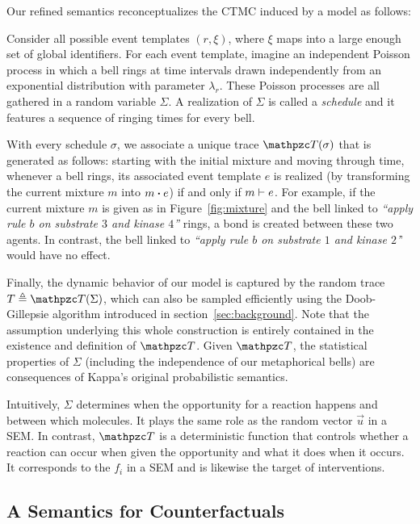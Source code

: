 Our refined semantics reconceptualizes the CTMC induced by a model as
follows:
\begin{inparaenum}[(i)]
\item Consider all possible event templates $(r, \xi)$, where $\xi$
  maps into a large enough set of global identifiers. For each event
  template, imagine an independent Poisson process in which a bell
  rings at time intervals drawn independently from an exponential
  distribution with parameter $\lambda_r$. These Poisson processes are
  all gathered in a random variable $\Sigma$. A realization of
  $\Sigma$ is called a \emph{schedule} and it features a sequence of
  ringing times for every bell.
\item With every schedule $\sigma$, we associate a unique trace
  $\DetTrace(\sigma)$ that is generated as follows: starting with the
  initial mixture and moving through time, whenever a bell rings, its
  associated event template $e$ is realized (by transforming the
  current mixture $m$ into $\UPDATE{m}{e}$) if and only if
  $m \vdash e$. For example, if the current mixture $m$ is
  given as in Figure~\ref{fig:mixture} and the bell linked to
  \textit{``apply rule $b$ on substrate $3$ and kinase $4$''} rings, a
  bond is created between these two agents. In contrast, the bell
  linked to \textit{``apply rule $b$ on substrate $1$ and kinase
    $2$'}' would have no effect.
\item Finally, the dynamic behavior of our model is captured by the
  random trace $T \eqdef \DetTrace(\Sigma)$, which can also be sampled
  efficiently using the Doob-Gillepsie algorithm introduced in
  section~\ref{sec:background}.  Note that the assumption underlying
  this whole construction is entirely contained in the existence and
  definition of $\DetTrace$.  Given $\DetTrace$, the statistical
  properties of $\Sigma$ (including the independence of our
  metaphorical bells) are consequences of Kappa's original
  probabilistic semantics.
\end{inparaenum}


Intuitively, $\Sigma$ determines when the opportunity for a reaction
happens and between which molecules. It plays the same role as the
random vector $\vec u$ in a SEM. In contrast, $\DetTrace$ is a
deterministic function that controls whether a reaction can occur when
given the opportunity and what it does when it occurs.  It corresponds
to the $f_i$ in a SEM and is likewise the target of interventions.


\subsection{A Semantics for Counterfactuals}
\label{subsec:counterfactuals-semantics}

